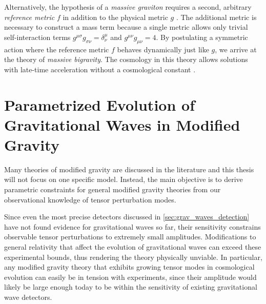 Alternatively, the hypothesis of a \emph{massive graviton} requires a second, arbitrary \emph{reference metric} \(f\) in addition to the physical metric \(g\) \autocite{deRham2014}. The additional metric is necessary to construct a mass term because a single metric allows only trivial self-interaction terms \(g^{\mu\sigma}g_{\sigma\nu}=\delta^\mu_\nu\) and \(g^{\mu\nu}g_{\mu\nu} = 4\). By postulating a symmetric action where the reference metric \(f\) behaves dynamically just like \(g\), we arrive at the theory of \emph{massive bigravity}.
The cosmology in this theory allows solutions with late-time acceleration without a cosmological constant \autocite{Akrami2013,Konnig2014}.



\cleardoublepage
\chapter{Parametrized Evolution of Gravitational Waves in Modified Gravity}\label{ch:param_mod_grav}

Many theories of modified gravity are discussed in the literature \autocite{Clifton2012,Euclid2013,deRham2014} and this thesis will not focus on one specific model. Instead, the main objective is to derive parametric constraints for general modified gravity theories from our observational knowledge of tensor perturbation modes.

Since even the most precise detectors discussed in \autoref{sec:grav_waves_detection} have not found evidence for gravitational waves so far, their sensitivity constrains observable tensor perturbations to extremely small amplitudes. Modifications to general relativity that affect the evolution of gravitational waves can exceed these experimental bounds, thus rendering the theory physically unviable. In particular, any modified gravity theory that exhibits growing tensor modes in cosmological evolution can easily be in tension with experiments, since their amplitude would likely be large enough today to be within the sensitivity of existing gravitational wave detectors.

